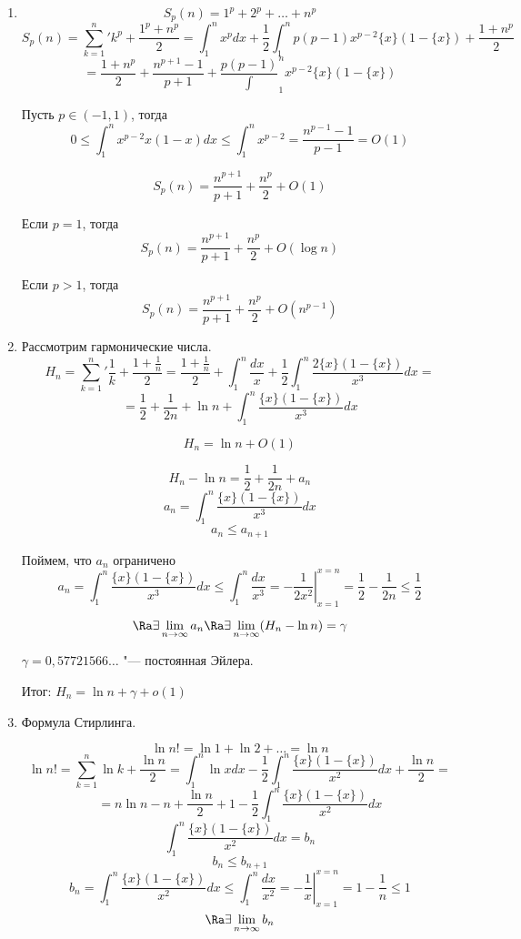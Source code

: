 ﻿\begin{exmp}
\begin{enumerate}
\item 
$$S_p(n) = 1^p + 2^p + \ldots + n^p$$
$$S_p(n) = {\sum_{k = 1}^{n}}' k^p + \frac{1^p + n^p}{2} = 
\int_1^n x^p dx + \frac{1}{2}\int_1^n p(p - 1)x^{p - 2}\{x\}(1 - \{x\}) + \frac{1 + n^p}{2}$$
$$= \frac{1 + n^p}{2} + \frac{n^{p + 1} - 1}{p + 1} + \frac{p(p - 1)}\int_1^n x^{p - 2}\{x\}(1 - \{x\})$$

Пусть $p \in (-1, 1)$, тогда
$$0 \le \int_1^n x^{p - 2}{x}(1 - {x})dx \le \int_1^{n}x^{p - 2} = 
\frac{n^{p - 1} - 1}{p - 1} = O(1)$$

$$S_p(n) = \frac{n^{p + 1}}{p + 1} + \frac{n^p}{2} + O(1)$$


Если $p = 1$, тогда
$$S_p(n) = \frac{n^{p + 1}}{p + 1} + \frac{n^p}{2} + O(\log n)$$

Если $p > 1$, тогда
$$S_p(n) = \frac{n^{p + 1}}{p + 1} + \frac{n^p}{2} + O(n^{p - 1})$$

\item
Рассмотрим гармонические числа.
$$H_n = {\sum_{k = 1}^n}' \frac{1}{k} + \frac{1 + \frac{1}{n}}{2} =
\frac{1 + \frac{1}{n}}{2} + \int_1^{n}\frac{dx}{x} + \frac{1}{2}\int_1^n\frac{2\{x\}(1 - \{x\})}{x^3}dx =$$
$$= \frac{1}{2} + \frac{1}{2n} + \ln n + \int_1^n\frac{\{x\}(1 - \{x\})}{x^3}dx$$

$$H_n = \ln n + O(1)$$

$$H_n - \ln n = \frac{1}{2} + \frac{1}{2n} + a_n$$
$$a_n = \int_1^n\frac{\{x\}(1 - \{x\})}{x^3}dx$$
$$a_n \le a_{n + 1}$$

Поймем, что $a_n$ ограничено
$$a_n = \int_1^n\frac{\{x\}(1 - \{x\})}{x^3}dx \le 
\int_1^{n}\frac{dx}{x^3} = \left. -\frac{1}{2x^2}\right |_{x = 1}^{x = n} = 
\frac{1}{2} - \frac{1}{2n} \le \frac{1}{2}$$

$$\Ra \exists \lim_{n \to \infty} a_n \Ra \exists \lim_{n \to \infty}(H_n - \ln n) = \gamma$$ 

$\gamma = 0,57721566\ldots$ "--- постоянная Эйлера.

Итог: $H_n = \ln n + \gamma + o(1)$
\item Формула Стирлинга.

$$\ln n! = \ln 1 + \ln 2 + \ldots = \ln n$$
$$\ln n! = \sum_{k = 1}^{n}\ln k + \frac{\ln n}{2} =
\int_{1}^{n}\ln xdx - \frac{1}{2}\int_{1}^{n}\frac{\{x\}(1 - \{x\})}{x^2}dx + \frac{\ln n}{2} =$$
$$= n\ln n - n + \frac{\ln n}{2} + 1 - \frac{1}{2}\int_{1}^{n}\frac{\{x\}(1 - \{x\})}{x^2}dx $$
$$\int_{1}^{n}\frac{\{x\}(1 - \{x\})}{x^2}dx = b_n$$
$$b_n \le b_{n + 1}$$
$$b_n = \int_{1}^{n}\frac{\{x\}(1 - \{x\})}{x^2}dx  \le \int_1^{n}\frac{dx}{x^2} = \left. -\frac{1}{x} \right|_{x = 1}^{x = n} = 1 -\frac{1}{n} \le 1$$
$$\Ra \exists \lim_{n \to \infty} b_n$$


\end{enumerate}
\end{exmp}
